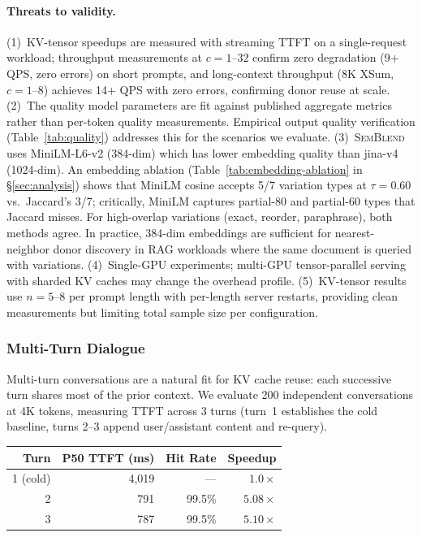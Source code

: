 \documentclass[10pt,twocolumn]{article}
\newcommand{\semblend}{\textsc{SemBlend}\xspace}
\begin{document}
\paragraph{Threats to validity.}
(1)~KV-tensor speedups are measured with streaming TTFT on a
single-request workload; throughput measurements at $c{=}1$--$32$
confirm zero degradation (9+ QPS, zero errors) on short prompts,
and long-context throughput (8K XSum, $c{=}1$--$8$) achieves
14+ QPS with zero errors, confirming donor reuse at scale.
(2)~The quality model parameters are fit against published aggregate
metrics rather than per-token quality measurements. Empirical output
quality verification (Table~\ref{tab:quality}) addresses this for
the scenarios we evaluate.
(3)~\semblend uses MiniLM-L6-v2 (384-dim) which has lower
embedding quality than jina-v4 (1024-dim). An embedding ablation
(Table~\ref{tab:embedding-ablation} in \S\ref{sec:analysis}) shows that
MiniLM cosine accepts 5/7 variation types at $\tau{=}0.60$ vs.\
Jaccard's 3/7; critically, MiniLM captures partial-80 and partial-60
types that Jaccard misses. For high-overlap variations (exact, reorder,
paraphrase), both methods agree. In practice, 384-dim embeddings
are sufficient for nearest-neighbor donor discovery in RAG workloads
where the same document is queried with variations.
(4)~Single-GPU experiments; multi-GPU tensor-parallel serving with
sharded KV caches may change the overhead profile.
(5)~KV-tensor results use $n{=}5$--$8$ per prompt length with per-length
server restarts, providing clean measurements but limiting total sample
size per configuration.

\subsubsection{Multi-Turn Dialogue}
\label{sec:multiturn}

Multi-turn conversations are a natural fit for KV cache reuse: each
successive turn shares most of the prior context. We evaluate 200
independent conversations at 4K tokens, measuring TTFT across 3 turns
(turn~1 establishes the cold baseline, turns 2--3 append user/assistant
content and re-query).

\begin{center}
\small
\begin{tabular}{@{}rrrr@{}}
\toprule
\textbf{Turn} & \textbf{P50 TTFT (ms)} & \textbf{Hit Rate} & \textbf{Speedup} \\
\midrule
1 (cold)  & 4,019 & ---    & $1.0\times$ \\
2         & 791   & 99.5\% & $5.08\times$ \\
3         & 787   & 99.5\% & $5.10\times$ \\
\bottomrule
\end{tabular}
\end{center}
\end{document}
